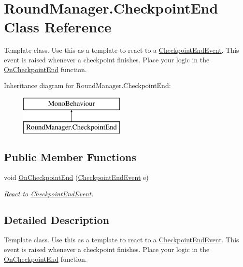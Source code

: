 \hypertarget{class_round_manager_1_1_checkpoint_end}{}\section{Round\+Manager.\+Checkpoint\+End Class Reference}
\label{class_round_manager_1_1_checkpoint_end}


Template class. Use this as a template to react to a \hyperlink{class_round_manager_1_1_events_1_1_checkpoint_end_event}{Checkpoint\+End\+Event}. This event is raised whenever a checkpoint finishes. Place your logic in the \hyperlink{class_round_manager_1_1_checkpoint_end_acd74137784d3b7e6bee8db735abac53d}{On\+Checkpoint\+End} function.  


Inheritance diagram for Round\+Manager.\+Checkpoint\+End\+:\begin{figure}[H]
\begin{center}
\leavevmode
\includegraphics[height=2.000000cm]{class_round_manager_1_1_checkpoint_end}
\end{center}
\end{figure}
\subsection*{Public Member Functions}
\begin{DoxyCompactItemize}
\item 
void \hyperlink{class_round_manager_1_1_checkpoint_end_acd74137784d3b7e6bee8db735abac53d}{On\+Checkpoint\+End} (\hyperlink{class_round_manager_1_1_events_1_1_checkpoint_end_event}{Checkpoint\+End\+Event} e)
\begin{DoxyCompactList}\small\item\em React to \hyperlink{class_round_manager_1_1_events_1_1_checkpoint_end_event}{Checkpoint\+End\+Event}. \end{DoxyCompactList}\end{DoxyCompactItemize}


\subsection{Detailed Description}
Template class. Use this as a template to react to a \hyperlink{class_round_manager_1_1_events_1_1_checkpoint_end_event}{Checkpoint\+End\+Event}. This event is raised whenever a checkpoint finishes. Place your logic in the \hyperlink{class_round_manager_1_1_checkpoint_end_acd74137784d3b7e6bee8db735abac53d}{On\+Checkpoint\+End} function. 



